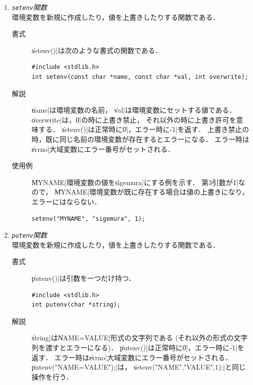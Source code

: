 \begin{enumerate}
\item \emph{\texttt{setenv}関数} \\
  環境変数を新規に作成したり，値を上書きしたりする関数である．

  \begin{description}
  \item [書式] \|setenv()|は次のような書式の関数である．

\begin{lstlisting}[numbers=none]
#include <stdlib.h>
int setenv(const char *name, const char *val, int overwrite);
\end{lstlisting}

  \item [解説]
    \|name|は環境変数の名前，
    \|val|は環境変数にセットする値である．
    \|overwrite|は，\|0|の時に上書き禁止，
    それ以外の時に上書き許可を意味する．
    \|setenv()|は正常時に\|0|，エラー時に\|-1|を返す．
    上書き禁止の時，既に同じ名前の環境変数が存在するとエラーになる．
    エラー時は\|errno|大域変数にエラー番号がセットされる．

  \item [使用例] \|MYNAME|環境変数の値を\|sigemura|にする例を示す．
    第3引数が\|1|なので，
    \|MYNAME|環境変数が既に存在する場合は値の上書きになり，
    エラーにはならない．

\begin{lstlisting}[numbers=none]
setenv("MYNAME", "sigemura", 1);
\end{lstlisting}
  \end{description}

\item \emph{\texttt{putenv}関数} \\
  環境変数を新規に作成したり，値を上書きしたりする関数である．

  \begin{description}
  \item [書式] \|putenv()|は引数を一つだけ持つ．

\begin{lstlisting}[numbers=none]
#include <stdlib.h>
int putenv(char *string);
\end{lstlisting}

  \item [解説]
    \|string|は\|NAME=VALUE|形式の文字列である
    (それ以外の形式の文字列を渡すとエラーになる)．
    \|putenv()|は正常時に\|0|，エラー時に\|-1|を返す．
    エラー時は\|errno|大域変数にエラー番号がセットされる．
    \|putenv("NAME=VALUE");|は，
    \|setenv("NAME","VALUE",1);|と同じ操作を行う．


\end{description}
\end{enumerate}
